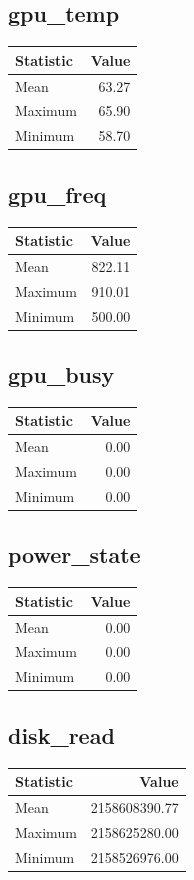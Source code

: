 \documentclass[11pt]{article}
\begin{document}
\subsection{gpu_temp}
\begin{tabular}{lr}
\toprule
Statistic & Value \\
\midrule
Mean & 63.27 \\
Maximum & 65.90 \\
Minimum & 58.70 \\
\bottomrule
\end{tabular}


\subsection{gpu_freq}
\begin{tabular}{lr}
\toprule
Statistic & Value \\
\midrule
Mean & 822.11 \\
Maximum & 910.01 \\
Minimum & 500.00 \\
\bottomrule
\end{tabular}


\subsection{gpu_busy}
\begin{tabular}{lr}
\toprule
Statistic & Value \\
\midrule
Mean & 0.00 \\
Maximum & 0.00 \\
Minimum & 0.00 \\
\bottomrule
\end{tabular}


\subsection{power_state}
\begin{tabular}{lr}
\toprule
Statistic & Value \\
\midrule
Mean & 0.00 \\
Maximum & 0.00 \\
Minimum & 0.00 \\
\bottomrule
\end{tabular}


\subsection{disk_read}
\begin{tabular}{lr}
\toprule
Statistic & Value \\
\midrule
Mean & 2158608390.77 \\
Maximum & 2158625280.00 \\
Minimum & 2158526976.00 \\
\bottomrule
\end{tabular}
\end{document}
